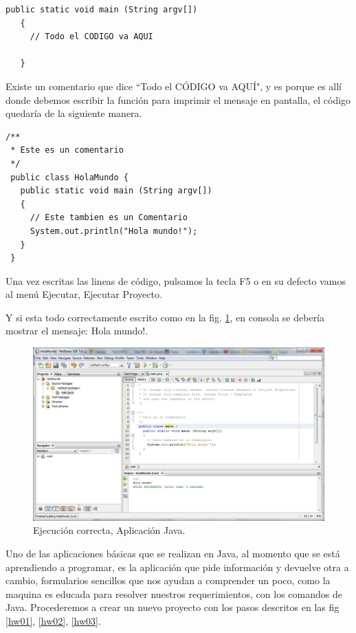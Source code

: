\documentclass[12pt]{book} %
\begin{document}
\noindent
\begin{lstlisting}[frame=single]
   public static void main (String argv[])
   {
     // Todo el CODIGO va AQUI
     
   }
\end{lstlisting}

Existe un comentario que dice ``Todo el CÓDIGO va AQUÍ", y es porque es allí donde debemos escribir la función para imprimir el mensaje en pantalla, el código quedaría de la siguiente manera.

\begin{lstlisting}[frame=single]
/**
 * Este es un comentario
 */
 public class HolaMundo {
   public static void main (String argv[])
   {
     // Este tambien es un Comentario
     System.out.println("Hola mundo!");
   }
 }
\end{lstlisting}

Una vez escritas las lineas de código, pulsamos la tecla F5 o en su defecto vamos al menú Ejecutar, Ejecutar Proyecto.

Y si esta todo correctamente escrito como en la fig. \ref{hw04}, en consola se debería mostrar el mensaje: Hola mundo!.

	\begin{figure}[h]
		\centering
			\includegraphics[width=16cm]{Hola_mundo_004.jpg}
			\caption{Ejecución correcta, Aplicación Java.}
			\label{hw04}
	\end{figure}
	
\newpage
Uno de las aplicaciones básicas que se realizan en Java, al momento que se está aprendiendo a programar, es la aplicación que pide información y devuelve otra a cambio, formularios sencillos que nos ayudan a comprender un poco, como la maquina es educada para resolver nuestros requerimientos, con los comandos de Java.
Procederemos a crear un nuevo proyecto con los pasos descritos en las fig \ref{hw01}, \ref{hw02}, \ref{hw03}.
 
\end{document}
